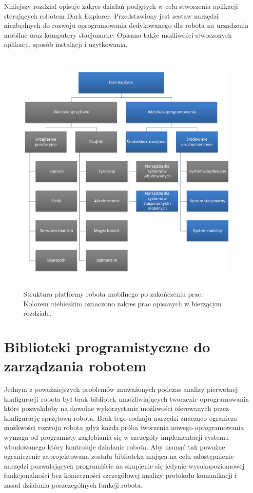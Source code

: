 Niniejszy rozdział opisuje zakres działań podjętych w celu stworzenia aplikacji sterujących robotem Dark Explorer. Przedstawiony jest zestaw narzędzi niezbędnych do rozwoju oprogramowania dedykowanego dla robota na urządzenia mobilne oraz komputery stacjonarne. Opisano także możliwości stworzonych aplikacji, sposób instalacji i użytkowania.

\begin{figure}[!ht]
 \centering
 \includegraphics[height=125mm]{../images/ch03/dark_explorer_platform_ide_stac_mob.png}
 \caption{Struktura platformy robota mobilnego po zakończeniu prac. Kolorem niebieskim oznaczono zakres prac opisanych w bierzącym rozdziale.}
 \label{fig:DarkExplorerPlatformStacMob}
\end{figure}

\section{Biblioteki programistyczne do zarządzania robotem}
Jednym z poważniejszych problemów zauważonych podczas analizy pierwotnej
konfiguracji robota był brak bibliotek umożliwiających tworzenie oprogramowania
które pozwalałoby na dowolne wykorzystanie możliwości oferowanych przez
konfigurację sprzętową robota. Brak tego rodzaju narzędzi znacząco ogranicza
możliwości rozwoju robota gdyż każda próba tworzenia nowego oprogramowania wymaga
od programisty zagłębiania się w szczegóły implementacji systemu wbudowanego
który kontroluje działanie robota. Aby usunąć tak poważne ograniczenie
zaprojektowana została biblioteka mająca na celu udostępnienie narzędzi
pozwalających programiście na skupienie się jedynie wysokopoziomowej
funkcjonalności bez konieczności szczegółowej analizy protokołu komunikacji i
zasad działania poszczególnych funkcji robota.

